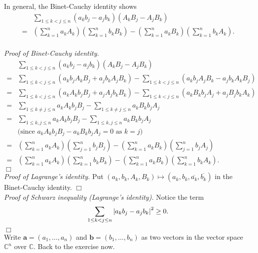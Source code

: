 \documentclass{article}
\begin{document}
In general, the Binet-Cauchy identity shows
\begin{align*}
&\sum_{1 \leq k < j \leq n}
(a_k b_j - a_j b_k)(A_k B_j - A_j B_k) \\
= &\left( \sum_{k=1}^{n} a_k A_k \right)\left( \sum_{k=1}^{n} b_k B_k \right)
- \left( \sum_{k=1}^{n} a_k B_k \right)\left( \sum_{k=1}^{n} b_k A_k \right).
\end{align*} \\

\emph{Proof of Binet-Cauchy identity.}
\begin{align*}
&\sum_{1 \leq k < j \leq n}
(a_k b_j - a_j b_k)(A_k B_j - A_j B_k) \\
= &\sum_{1 \leq k < j \leq n}
(a_k b_j A_k B_j + a_j b_k A_j B_k)
- \sum_{1 \leq k < j \leq n}
(a_k b_j A_j B_k - a_j b_k A_k B_j) \\
= &\sum_{1 \leq k < j \leq n}
(a_k A_k b_j B_j + a_j A_j b_k B_k)
- \sum_{1 \leq k < j \leq n}
(a_k B_k b_j A_j + a_j B_j b_k A_k) \\
= &\sum_{1 \leq k \neq j \leq n} a_k A_k b_j B_j
 - \sum_{1 \leq k \neq j \leq n} a_k B_k b_j A_j \\
= &\sum_{1 \leq k, j \leq n} a_k A_k b_j B_j
 - \sum_{1 \leq k, j \leq n} a_k B_k b_j A_j \\
  & \text{(since $a_k A_k b_j B_j - a_k B_k b_j A_j = 0$ as $k = j$)} \\
= &\left( \sum_{k=1}^{n} a_k A_k \right)\left( \sum_{j=1}^{n} b_j B_j \right)
- \left( \sum_{k=1}^{n} a_k B_k \right)\left( \sum_{j=1}^{n} b_j A_j \right) \\
= &\left( \sum_{k=1}^{n} a_k A_k \right)\left( \sum_{k=1}^{n} b_k B_k \right)
- \left( \sum_{k=1}^{n} a_k B_k \right)\left( \sum_{k=1}^{n} b_k A_k \right).
\end{align*}
$\Box$ \\

\emph{Proof of Lagrange's identity.}
Put $(a_k, b_k, A_k, B_k) \mapsto (a_k, b_k, \overline{a_k}, \overline{b_k})$
in the Binet-Cauchy identity.
$\Box$ \\

\emph{Proof of Schwarz inequality (Lagrange's identity).}
Notice the term $$\sum_{1 \leq k < j \leq n} \abs{ a_k b_j - a_j b_k }^2 \geq 0.$$
$\Box$ \\

Write $\mathbf{a} = (a_1, \ldots, a_n)$ and $\mathbf{b} = (b_1, \ldots, b_n)$
as two vectors in the vector space $\mathbb{C}^n$ over $\mathbb{C}$.
Back to the exercise now. \\
\end{document}

